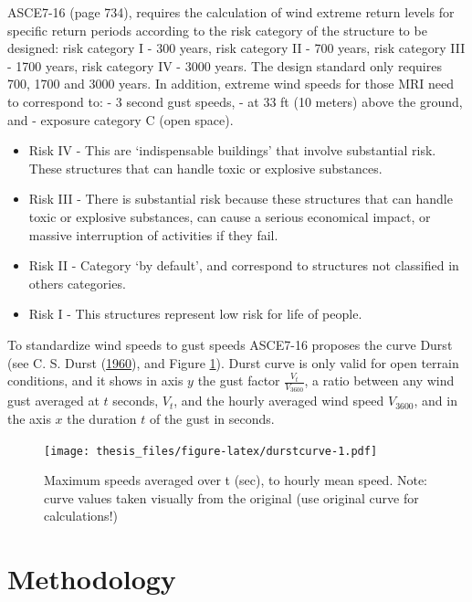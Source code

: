 \documentclass[12pt,oneside]{reedthesis}
\providecommand{\tightlist}{%
  \setlength{\itemsep}{0pt}\setlength{\parskip}{0pt}}
\begin{document}
ASCE7-16 (page 734), requires the calculation of wind extreme return levels for specific return periods according to the risk category of the structure to be designed: risk category I - 300 years, risk category II - 700 years, risk category III - 1700 years, risk category IV - 3000 years. The design standard only requires 700, 1700 and 3000 years. In addition, extreme wind speeds for those MRI need to correspond to: - 3 second gust speeds, - at 33 ft (10 meters) above the ground, and - exposure category C (open space).
\begin{itemize}
\tightlist
\item
  Risk IV - This are `indispensable buildings' that involve substantial risk. These structures that can handle toxic or explosive substances.
\item
  Risk III - There is substantial risk because these structures that can handle toxic or explosive substances, can cause a serious economical impact, or massive interruption of activities if they fail.
\item
  Risk II - Category `by default', and correspond to structures not classified in others categories.
\item
  Risk I - This structures represent low risk for life of people.
\end{itemize}
To standardize wind speeds to gust speeds ASCE7-16 proposes the curve Durst (see C. S. Durst (\protect\hyperlink{ref-Durst1960}{1960}), and Figure \ref{fig:durstcurve}). Durst curve is only valid for open terrain conditions, and it shows in axis \(y\) the gust factor \(\frac{V_t}{V_{3600}}\), a ratio between any wind gust averaged at \(t\) seconds, \(V_t\), and the hourly averaged wind speed \(V_{3600}\), and in the axis \(x\) the duration \(t\) of the gust in seconds.
\begin{figure}
\centering
\texttt{[image: thesis\_files/figure-latex/durstcurve-1.pdf]}
\caption{\label{fig:durstcurve}Maximum speeds averaged over t (sec), to hourly mean speed. Note: curve values taken visually from the original (use original curve for calculations!)}
\end{figure}
\hypertarget{rmd-method}{%
\chapter{Methodology}\label{rmd-method}}
\end{document}
